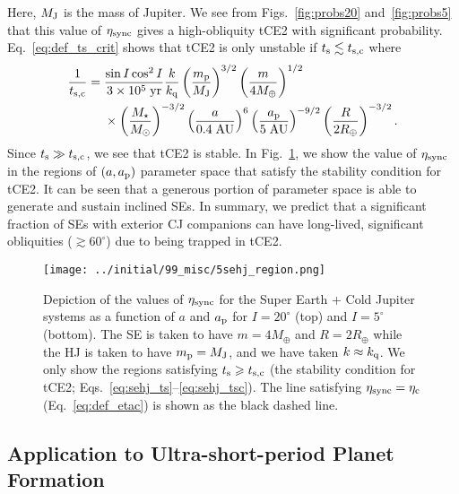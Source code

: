\documentclass[
        fleqn,
        usenatbib,
        referee,
    ]{mnras}
\newcommand*{\p}[1]{\left(#1\right)}
\newlength{\colummwidth}
\begin{document}
Here, $M_{\rm J}$ is the mass of Jupiter. We see from Figs.~\ref{fig:probs20}
and~\ref{fig:probs5} that this value of $\eta_{\rm sync}$ gives a high-obliquity
tCE2 with significant probability. Eq.~\eqref{eq:def_ts_crit} shows that tCE2 is
only unstable if $t_{\rm s} \lesssim t_{\rm s, c}$ where
\begin{align}
    \frac{1}{t_{\rm s, c}} ={}& \frac{\sin I \cos^2 I}{3 \times
        10^5\;\mathrm{yr}}
            \frac{k}{k_{\rm q}}
            \p{\frac{m_{\rm p}}{M_{\rm J}}}^{3/2}
            \p{\frac{m}{4 M_{\oplus}}}^{1/2}\nonumber\\
        &\times \p{\frac{M_\star}{M_{\odot}}}^{-3/2}
            \p{\frac{a}{0.4\;\mathrm{AU}}}^6
            \p{\frac{a_{\rm p}}{5\;\mathrm{AU}}}^{-9/2}
            \p{\frac{R}{2 R_{\oplus}}}^{-3/2}.
            \label{eq:sehj_tsc}
\end{align}
Since $t_{\rm s} \gg t_{\rm s, c}$, we see that tCE2 is stable. In
Fig.~\ref{fig:sehj_region}, we show the value of $\eta_{\rm sync}$ in the
regions of $\p{a, a_{\rm p}}$ parameter space that satisfy the stability
condition for tCE2. It can be seen that a generous portion of parameter space is
able to generate and sustain inclined SEs. In summary, we predict that a
significant fraction of SEs with exterior CJ companions can have long-lived,
significant obliquities ($\gtrsim 60^\circ$) due to being trapped in tCE2.
\begin{figure}
    \centering
    \texttt{[image: ../initial/99\_misc/5sehj\_region.png]}
    \caption{Depiction of the values of $\eta_{\rm sync}$ for the Super Earth +
    Cold Jupiter systems as a function of $a$ and $a_{\rm p}$ for $I = 20^\circ$
    (top) and $I = 5^\circ$ (bottom). The SE is taken to have
    $m = 4M_{\oplus}$ and $R = 2R_{\oplus}$ while the HJ is taken to have
    $m_{\rm p} = M_{\rm J}$, and we have taken $k \approx k_{\rm q}$. We only
    show the regions satisfying $t_{\rm s} \geq t_{\rm s, c}$ (the stability
    condition for tCE2; Eqs.~\ref{eq:sehj_ts}--\ref{eq:sehj_tsc}). The line
    satisfying $\eta_{\rm sync} = \eta_{\rm c}$ (Eq.~\ref{eq:def_etac}) is shown
    as the black dashed line.}\label{fig:sehj_region}
\end{figure}

\subsection{Application to Ultra-short-period Planet Formation
}\label{ss:disc_usp}
\end{document}
